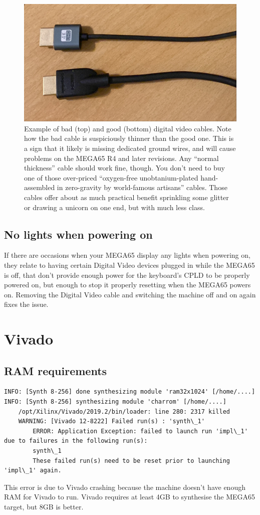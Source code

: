 \begin{figure}
\label{baddvicable}
\caption{Example of bad (top) and good (bottom) digital video cables. Note how the bad cable is suspiciously thinner than the good one. This is a sign that it likely is missing dedicated ground wires, and will cause problems on the MEGA65 R4 and later revisions.  Any ``normal thickness'' cable should work fine, though. You don't need to buy one of those over-priced ``oxygen-free unobtanium-plated hand-assembled in zero-gravity by world-famous artisans'' cables.  Those cables offer about as much practical benefit sprinkling some glitter or drawing a unicorn on one end, but with much less class.}
\centering
 \includegraphics[width=0.7\linewidth]{images/bad-and-good-video-cables.jpg}
\end{figure}
    
    \subsection{No lights when powering on}
    If there are occasions when your MEGA65 display any lights when powering on, they relate to having certain Digital Video devices plugged in while the MEGA65 is off, that don't provide enough power for the keyboard's CPLD to be properly powered on, but enough to stop it properly resetting when the MEGA65 powers on. Removing the Digital Video cable and switching the machine off and on again fixes the issue.

\section{Vivado}
    \subsection{RAM requirements}
    \begin{tcolorbox}[colback=black,coltext=white]
    \begin{lstlisting}
INFO: [Synth 8-256] done synthesizing module 'ram32x1024' [/home/....]
INFO: [Synth 8-256] synthesizing module 'charrom' [/home/....]
    /opt/Xilinx/Vivado/2019.2/bin/loader: line 280: 2317 killed
    WARNING: [Vivado 12-8222] Failed run(s) : 'synth\_1'
        ERROR: Application Exception: failed to launch run 'impl\_1' due to failures in the following run(s):
        synth\_1
        These failed run(s) need to be reset prior to launching 'impl\_1' again.
    \end{lstlisting}
    \end{tcolorbox}
This error is due to Vivado crashing because the machine doesn't have enough RAM for Vivado to run.
Vivado requires at least 4GB to synthesise the MEGA65 target, but 8GB is better.

